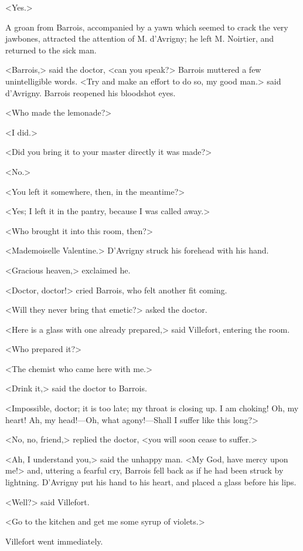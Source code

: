  <Yes.> 

 A groan from Barrois, accompanied by a yawn which seemed to crack the very jawbones, attracted the attention of M. d'Avrigny; he left M. Noirtier, and returned to the sick man. 

 <Barrois,> said the doctor, <can you speak?> Barrois muttered a few unintelligible words. <Try and make an effort to do so, my good man.> said d'Avrigny. Barrois reopened his bloodshot eyes. 

 <Who made the lemonade?> 

 <I did.> 

 <Did you bring it to your master directly it was made?> 

 <No.> 

 <You left it somewhere, then, in the meantime?> 

 <Yes; I left it in the pantry, because I was called away.> 

 <Who brought it into this room, then?> 

 <Mademoiselle Valentine.> D'Avrigny struck his forehead with his hand. 

 <Gracious heaven,> exclaimed he. 

 <Doctor, doctor!> cried Barrois, who felt another fit coming. 

 <Will they never bring that emetic?> asked the doctor. 

 <Here is a glass with one already prepared,> said Villefort, entering the room. 

 <Who prepared it?> 

 <The chemist who came here with me.>

<Drink it,> said the doctor to Barrois. 

 <Impossible, doctor; it is too late; my throat is closing up. I am choking! Oh, my heart! Ah, my head!—Oh, what agony!—Shall I suffer like this long?> 

 <No, no, friend,> replied the doctor, <you will soon cease to suffer.> 

 <Ah, I understand you,> said the unhappy man. <My God, have mercy upon me!> and, uttering a fearful cry, Barrois fell back as if he had been struck by lightning. D'Avrigny put his hand to his heart, and placed a glass before his lips. 

 <Well?> said Villefort. 

 <Go to the kitchen and get me some syrup of violets.> 

 Villefort went immediately. 

